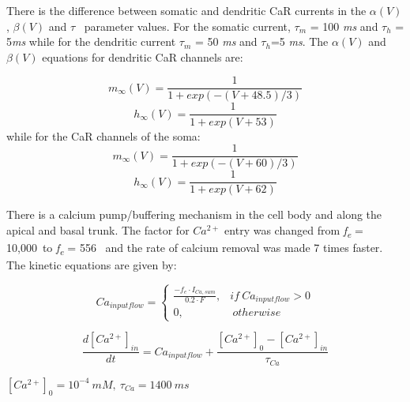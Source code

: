 \documentclass[a4paper,12pt]{article}
\begin{document}
 There is the difference between somatic and dendritic CaR currents in the $\alpha(V)$, $\beta(V)$ and $\tau$ ~parameter values. For the somatic current, $\tau_m$ = 100 \textit{ms} and $\tau_h$ = 5\textit{ms} while for the dendritic current $\tau_m$ = 50 \textit{ms} and $\tau_h$=5 \textit{ ms}. The $\alpha(V)$ and $\beta(V)$ equations for dendritic CaR channels are:

\begin{equation}
m_{\infty}(V)=\frac {1}{1+exp(-(V+48.5)/3)}
\end{equation}
\begin{equation}
h_{\infty}(V)=\frac {1}{1+exp(V+53)}
\end{equation}
while for the CaR channels of the soma:
\begin{equation}
m_{\infty}(V)=\frac {1}{1+exp(-(V+60)/3)}
\end{equation}
\begin{equation}
h_{\infty}(V)=\frac {1}{1+exp(V+62)}
\end{equation}

There is a calcium pump/buffering mechanism in the cell body and along the apical and basal trunk. The factor for $Ca^{2+}$ entry was changed from \textit{f\textsubscript{e}} = 10,000~to \textit{f\textsubscript{e}} = 556 ~and the rate of calcium removal was made 7 times faster. The kinetic equations are given by:

\begin{equation}
Ca_{input flow} = \begin{cases} \frac{-f_e \cdot I_{Ca, sum} }{0.2 \cdot F}, & if \ Ca_{input flow} > 0  \\ 0, & \  otherwise \ \end{cases}
\end{equation}

\begin{equation}
\frac{d[Ca^{2+}]_{in}}{dt}=Ca_{input flow} +\frac{[Ca^{2+}]_{0}-[Ca^{2+}]_{in}}{\tau_{Ca}}
\end{equation}

$[Ca^{2+}]_{0} = 10^{-4} \ mM, \ \tau_{Ca} = 1400 \ ms$


\bigskip
\end{document}
